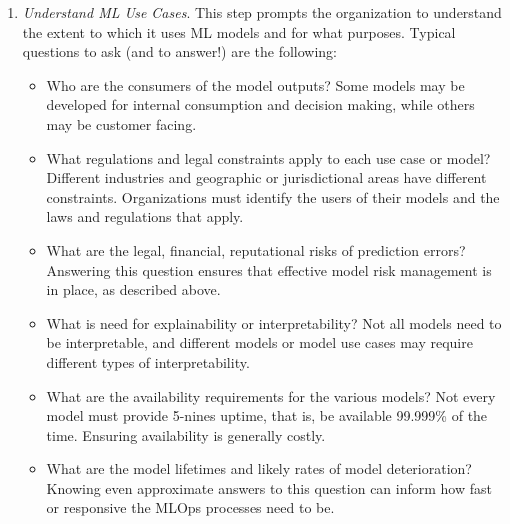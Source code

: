 \begin{enumerate}
\item \emph{Understand ML Use Cases}. This step prompts the organization to understand the extent to which it uses ML models and for what purposes. Typical questions to ask (and to answer!) are the following:
\begin{itemize}
  \item Who are the consumers of the model outputs? Some models may be developed for internal consumption and decision making, while others may be customer facing.
  \item What regulations and legal constraints apply to each use case or model? Different industries and geographic or jurisdictional areas have different constraints. Organizations must identify the users of their models and the laws and regulations that apply. 
  \item What are the legal, financial, reputational risks of prediction errors? Answering this question ensures that effective model risk management is in place, as described above. 
  \item What is need for explainability or interpretability? Not all models need to be interpretable, and different models or model use cases may require different types of interpretability.
  \item What are the availability requirements for the various models? Not every model must provide 5-nines uptime, that is, be available 99.999\% of the time. Ensuring availability is generally costly. 
  \item What are the model lifetimes and likely rates of model deterioration? Knowing even approximate answers to this question can inform how fast or responsive the MLOps processes need to be. 
\end{itemize}


\end{enumerate}
